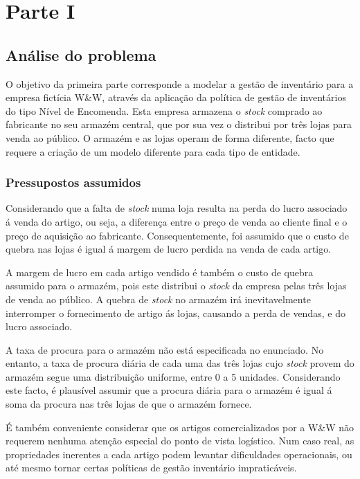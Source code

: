 \chapter{Parte I}

\section{Análise do problema}

O objetivo da primeira parte corresponde a modelar a gestão de inventário para
a empresa fictícia W\&W, através da aplicação da política de gestão de
inventários do tipo Nível de Encomenda. Esta empresa armazena o \emph{stock} comprado
ao fabricante no seu armazém central, que por sua vez o distribui por três lojas
para venda ao público. O armazém e as lojas operam de forma diferente, facto que
requere a criação de um modelo diferente para cada tipo de entidade.

\subsection{Pressupostos assumidos} 

Considerando que a falta de \emph{stock} numa loja resulta na perda do lucro associado
á venda do artigo, ou seja, a diferença entre o preço de venda ao cliente final
e o preço de aquisição ao fabricante. Consequentemente, foi assumido que o custo
de quebra nas lojas é igual á margem de lucro perdida na venda de cada artigo.

A margem de lucro em cada artigo vendido é também o custo de quebra assumido
para o armazém, pois este distribui o \emph{stock} da empresa pelas três lojas de venda
ao público. A quebra de \emph{stock} no armazém irá inevitavelmente interromper
o fornecimento de artigo ás lojas, causando a perda de vendas, e do lucro
associado. 

A taxa de procura para o armazém não está especificada no enunciado. No entanto,
a taxa de procura diária de cada uma das três lojas cujo \emph{stock} provem do armazém
segue uma distribuição uniforme, entre 0 a 5 unidades. Considerando este facto,
é plausível assumir que a procura diária para o armazém é igual á soma da
procura nas três lojas de que o armazém fornece.  

É também conveniente considerar que os artigos comercializados por a W\&W não
requerem nenhuma atenção especial do ponto de vista logístico. Num caso real, as
propriedades inerentes a cada artigo podem levantar dificuldades operacionais,
ou até mesmo tornar certas políticas de gestão inventário impraticáveis. 

